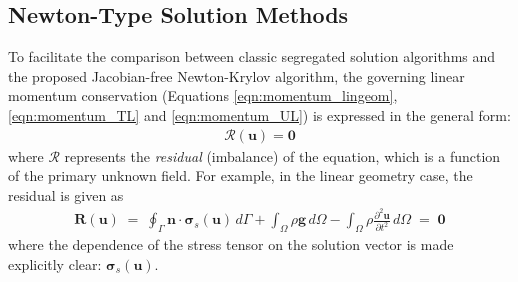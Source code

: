 \documentclass[sn-mathphys,Numbered,draft]{sn-jnl}%
\newcommand{\bb}{\boldsymbol}
\begin{document}
\subsection{Newton-Type Solution Methods}
To facilitate the comparison between classic segregated solution algorithms and the proposed Jacobian-free Newton-Krylov algorithm, the governing linear momentum conservation (Equations \ref{eqn:momentum_lingeom}, \ref{eqn:momentum_TL} and \ref{eqn:momentum_UL}) is expressed in the general form:
\begin{eqnarray} \label{eqn:residual}
	\mathcal{R}(\bb{u}) = \bb{0}
\end{eqnarray}
where $\mathcal{R}$ represents the \emph{residual} (imbalance) of the equation, which is a function of the primary unknown field.
For example, in the linear geometry case, the residual is given as
\begin{eqnarray}
    \bb{R}(\bb{u})
    \;=\;
    \oint_{\Gamma} \bb{n} \cdot \bb{\sigma}_s(\bb{u}) \,  d\Gamma
    + \int_{\Omega}  \rho \bb{g} \, d\Omega
    -  \int_{\Omega} \rho \frac{\partial^2 \bb{u} }{\partial t^2} \, d\Omega
    \;=\; \bb{0}
\end{eqnarray}
where the dependence of the stress tensor on the solution vector is made explicitly clear: $\bb{\sigma}_s(\bb{u})$.
\end{document}
